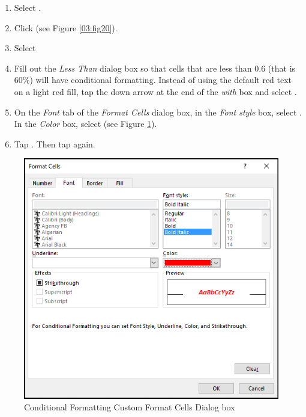 \begin{enumbox}
	\begin{enumerate}
		\item Select .
		\item Click  (see Figure \ref{03:fig20}).
		\item Select 
		\item Fill out the \textit{Less Than} dialog box so that cells that are less than $ 0.6 $ (that is 60\%) will have conditional formatting. Instead of using the default red text on a light red fill, tap the down arrow at the end of the \textit{with} box and select .
		\item On the \textit{Font} tab of the \textit{Format Cells} dialog box, in the \textit{Font style} box, select . In the \textit{Color} box, select  (see Figure \ref{03:fig22}).
		\item Tap . Then tap  again.
	\end{enumerate}
\end{enumbox}
	
\begin{figure}[H]
	\centering
	\includegraphics[width=\maxwidth{.95\linewidth}]{gfx/ch03_fig22}
	\caption{Conditional Formatting Custom Format Cells Dialog box}
	\label{03:fig22}
\end{figure}

